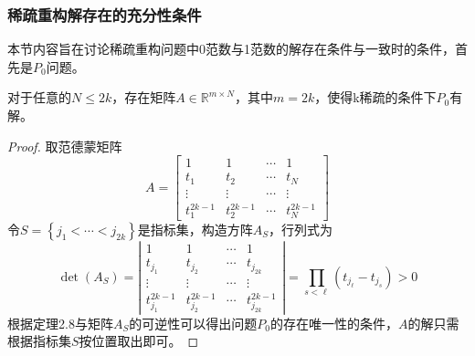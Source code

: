 \subsubsection{稀疏重构解存在的充分性条件}
本节内容旨在讨论稀疏重构问题中0范数与1范数的解存在条件与一致时的条件，首先是$P_0$问题。
\begin{theorem}
    对于任意的$N \le 2k$，存在矩阵$A\in \mathbb{R}^{m \times N}$，其中$m=2k$，使得k稀疏的条件下$P_0$有解。
\end{theorem}
\begin{proof}
    取范德蒙矩阵
    \begin{equation}
        A=\left[\begin{array}{cccc}
        1 & 1 & \cdots & 1 \\
        t_1 & t_2 & \cdots & t_N \\
        \vdots & \vdots & \cdots & \vdots \\
        t_1^{2 k-1} & t_2^{2 k-1} & \cdots & t_N^{2 k-1}
        \end{array}\right]
    \end{equation}
    令$S=\left\{j_1<\cdots<j_{2 k}\right\}$是指标集，构造方阵$A_S$，行列式为
    \begin{equation}
        \operatorname{det}\left(A_S\right)=\left|\begin{array}{cccc}
        1 & 1 & \cdots & 1 \\
        t_{j_1} & t_{j_2} & \cdots & t_{j_{2 k}} \\
        \vdots & \vdots & \cdots & \vdots \\
        t_{j_1}^{2 k-1} & t_{j_2}^{2 k-1} & \cdots & t_{j_{2 k}}^{2 k-1}
        \end{array}\right|=\prod_{s<\ell}\left(t_{j_{\ell}}-t_{j_s}\right)>0
    \end{equation}
    根据定理2.8与矩阵$A_S$的可逆性可以得出问题$P_0$的存在唯一性的条件，$A$的解只需根据指标集$S$按位置取出即可。
\end{proof}


